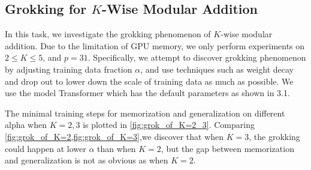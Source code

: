 \subsection{Grokking for $K$-Wise Modular Addition}
\label{sec:subtask4}
In this task, we investigate the grokking phenomenon of $K$-wise modular addition. Due to the limitation of GPU memory, we only perform experiments on $2\leq K\leq 5$, and $p=31$. Specifically, we attempt to discover grokking phenomenon by adjusting training data fraction $\alpha$, and use techniques such as weight decay and drop out to lower down the scale of training data as much as possible. We use the model Transformer which has the default parameters as shown in 3.1.

The minimal training steps for memorization and generalization on different alpha when $K=2, 3$ is plotted in \cref{fig:grok_of_K=2_3}. Comparing \cref{fig:grok_of_K=2,fig:grok_of_K=3},we discover that when $K=3$, the grokking could happen at lower $\alpha$ than when $K=2$, but the gap between memorization and generalization is not as obvious as when $K=2$.    
